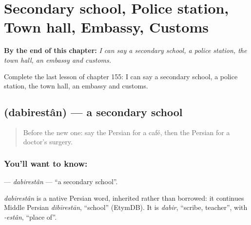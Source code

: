 
\chapter{Secondary school, Police station, Town hall, Embassy, Customs}
\label{ch:fa-secondary-school-police-station-town-hall-embassy-customs}

\begin{chapteropening}
\textbf{By the end of this chapter:} \emph{I can say a secondary school, a police station, the town hall, an embassy and customs.}

Complete the last lesson of chapter 155: I can say a secondary school, a police station, the town hall, an embassy and customs.
\end{chapteropening}

\section[\texorpdfstring{\fa{دبیرستان} (dabirestân)}{دبیرستان (dabirestân)}]{ (dabirestân) — a secondary school}

\label{lesson:FA-C155-dabirestan}



\begin{quote}
Before the new one: say the Persian for a café, then the Persian for a doctor's surgery.
\end{quote}

\subsection*{You'll want to know: }
\textbf{} — \emph{dabirestân} — \textquotedblleft{}a secondary school\textquotedblright{}.

\begin{cousinweb}
\emph{dabirestân} is a native Persian word, inherited rather than borrowed: it continues Middle Persian \emph{dibīrestān}, \textquotedblleft{}school\textquotedblright{} (EtymDB). It is \emph{dabir}, \textquotedblleft{}scribe, teacher\textquotedblright{}, with \emph{-estân}, \textquotedblleft{}place of\textquotedblright{}.
\end{cousinweb}

